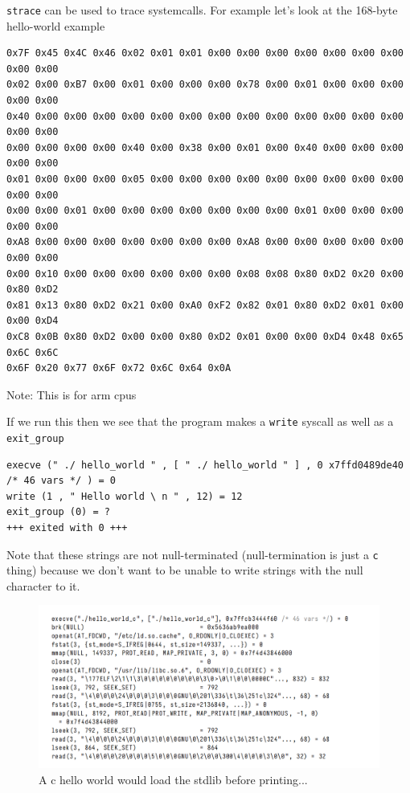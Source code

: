 \documentclass[../notes.tex]{subfiles}
\begin{document}
\texttt{strace} can be used to trace systemcalls. For example let's look at the 168-byte hello-world example


\begin{listing}[H]
\begin{verbatim}
0x7F 0x45 0x4C 0x46 0x02 0x01 0x01 0x00 0x00 0x00 0x00 0x00 0x00 0x00 0x00 0x00
0x02 0x00 0xB7 0x00 0x01 0x00 0x00 0x00 0x78 0x00 0x01 0x00 0x00 0x00 0x00 0x00
0x40 0x00 0x00 0x00 0x00 0x00 0x00 0x00 0x00 0x00 0x00 0x00 0x00 0x00 0x00 0x00
0x00 0x00 0x00 0x00 0x40 0x00 0x38 0x00 0x01 0x00 0x40 0x00 0x00 0x00 0x00 0x00
0x01 0x00 0x00 0x00 0x05 0x00 0x00 0x00 0x00 0x00 0x00 0x00 0x00 0x00 0x00 0x00
0x00 0x00 0x01 0x00 0x00 0x00 0x00 0x00 0x00 0x00 0x01 0x00 0x00 0x00 0x00 0x00
0xA8 0x00 0x00 0x00 0x00 0x00 0x00 0x00 0xA8 0x00 0x00 0x00 0x00 0x00 0x00 0x00
0x00 0x10 0x00 0x00 0x00 0x00 0x00 0x00 0x08 0x08 0x80 0xD2 0x20 0x00 0x80 0xD2
0x81 0x13 0x80 0xD2 0x21 0x00 0xA0 0xF2 0x82 0x01 0x80 0xD2 0x01 0x00 0x00 0xD4
0xC8 0x0B 0x80 0xD2 0x00 0x00 0x80 0xD2 0x01 0x00 0x00 0xD4 0x48 0x65 0x6C 0x6C
0x6F 0x20 0x77 0x6F 0x72 0x6C 0x64 0x0A
\end{verbatim}
\caption{Note: This is for arm cpus}
\end{listing}


If we run this then we see that the program makes a \texttt{write} syscall as well as a \texttt{exit\_group}

\begin{listing}[H]
\begin{verbatim}
execve (" ./ hello_world " , [ " ./ hello_world " ] , 0 x7ffd0489de40 /* 46 vars */ ) = 0
write (1 , " Hello world \ n " , 12) = 12
exit_group (0) = ?
+++ exited with 0 +++
\end{verbatim}
\end{listing}

Note that these strings are not null-terminated (null-termination is just a \texttt{c} thing) because we don't want to be unable to write strings with the null character to it.


\begin{figure}[H]
  \centering
  \includegraphics[width=0.8\linewidth]{img/image_2023-01-11-15-48-48.png}
  \caption{A c hello world would load the stdlib before printing...}
\end{figure}
\end{document}
